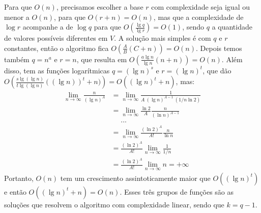 Para que $O(n)$, precisamos escolher a base $r$ com complexidade seja igual ou menor a $O(n)$, para que $O(r+n) = O(n)$,
mas que a complexidade de $\log r$ acompanhe a de $\log q$ para que $O\left(\frac{\lg q}{\lg r}\right) = O(1)$,
sendo $q$ a quantidade de valores possíveis diferentes em $V$.
A solução mais simples é com $q$ e $r$ constantes, então o algoritmo fica $O\left(\frac{A}{B}(C+n)\right) = O(n)$.
Depois temos também $q = n^a$ e $r = n$, que resulta em
$O\left(\frac{a \lg n}{\lg n}(n + n)\right) = O(n)$.
Além disso, tem as funções logarítmicas $q = (\lg n)^s$ e $r = (\lg n)^t$,
que dão $O\left(\frac{s\lg(\lg n)}{t\lg(\lg n)}((\lg n))^t + n)\right)
= O((\lg n)^t + n)$, mas:
\begin{align*}
    \lim_{n\to\infty} \frac{n}{(\lg n)^A}
    &= \lim_{n\to\infty} \frac{1}{A\ (\lg n)^{A-1}\ (1/n \ln 2)} \\
    &= \lim_{n\to\infty} \frac{\ln 2}{A} \frac{n}{(\ln n)^{A-1}} \\
    &\ \ \ \ \ \ ...\\
    &= \lim_{n\to\infty} \frac{(\ln 2)^A}{A!} \frac{n}{\ln n} \\
    &= \frac{(\ln 2)^A}{A!} \lim_{n\to\infty} \frac{1}{1/n} \\
    &= \frac{(\ln 2)^A}{A!} \lim_{n\to\infty} n = +\infty
\end{align*}
Portanto, $O(n)$ tem um crescimento assintoticamente maior que $O((\lg n)^t)$ e então $O((\lg n)^t + n) = O(n)$.
Esses três grupos de funções são as soluções que resolvem o algoritmo com complexidade linear, sendo que $k = q - 1$.